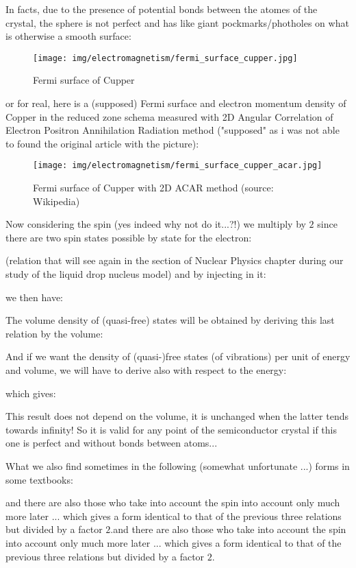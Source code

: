 	In facts, due to the presence of potential bonds between the atomes of the crystal, the sphere is not perfect and has like giant pockmarks/photholes on what is otherwise a smooth surface:
	\begin{figure}[H]
		\centering
		\texttt{[image: img/electromagnetism/fermi\_surface\_cupper.jpg]}
		\caption{Fermi surface of Cupper}
	\end{figure}
	or for real, here is a (supposed) Fermi surface and electron momentum density of Copper in the reduced zone schema measured with 2D Angular Correlation of Electron Positron Annihilation Radiation method ("supposed" as i was not able to found the original article with the picture):
	\begin{figure}[H]
		\centering
		\texttt{[image: img/electromagnetism/fermi\_surface\_cupper\_acar.jpg]}
		\caption[Fermi surface of Cupper with 2D ACAR method]{Fermi surface of Cupper with 2D ACAR method (source: Wikipedia)}
	\end{figure}
	Now considering the spin (yes indeed why not do it...?!) we multiply by $2$ since there are two spin states possible by state for the electron:
	
	(relation that will see again in the section of Nuclear Physics chapter during our study of the liquid drop nucleus model) and by injecting in it:
	
	we then have:
	
	The volume density of (quasi-free) states will be obtained by deriving this last relation by the volume:
	
	And if we want the density of (quasi-)free states (of vibrations) per unit of energy and volume, we will have to derive also with respect to the energy:
	
	which gives:
	
	This result does not depend on the volume, it is unchanged when the latter tends towards infinity! So it is valid for any point of the semiconductor crystal if this one is perfect and without bonds between atoms...
	
	What we also find sometimes in the following (somewhat unfortunate ...) forms in some textbooks:
	
	and there are also those who take into account the spin into account only much more later ... which gives a form identical to that of the previous three relations but divided by a factor $2$.and there are also those who take into account the spin into account only much more later ... which gives a form identical to that of the previous three relations but divided by a factor $2$.
	
